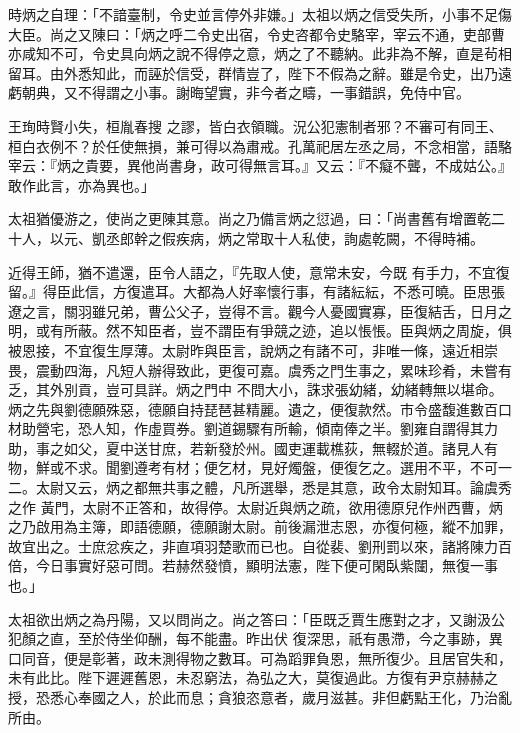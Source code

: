 \begin{pinyinscope}
 時炳之自理：「不諳臺制，令史並言停外非嫌。」太祖以炳之信受失所，小事不足傷大臣。尚之又陳曰：「炳之呼二令史出宿，令史咨都令史駱宰，宰云不通，吏部曹亦咸知不可，令史具向炳之說不得停之意，炳之了不聽納。此非為不解，直是茍相留耳。由外悉知此，而誣於信受，群情豈了，陛下不假為之辭。雖是令史，出乃遠虧朝典，又不得謂之小事。謝晦望實，非今者之疇，一事錯誤，免侍中官。



 王珣時賢小失，桓胤春搜
 之謬，皆白衣領職。況公犯憲制者邪？不審可有同王、桓白衣例不？於任使無損，兼可得以為肅戒。孔萬祀居左丞之局，不念相當，語駱宰云：『炳之貴要，異他尚書身，政可得無言耳。』又云：『不癡不聾，不成姑公。』敢作此言，亦為異也。」



 太祖猶優游之，使尚之更陳其意。尚之乃備言炳之愆過，曰：「尚書舊有增置乾二十人，以元、凱丞郎幹之假疾病，炳之常取十人私使，詢處乾闕，不得時補。



 近得王師，猶不遣還，臣令人語之，『先取人使，意常未安，今既
 有手力，不宜復留。』得臣此信，方復遣耳。大都為人好率懷行事，有諸紜紜，不悉可曉。臣思張遼之言，關羽雖兄弟，曹公父子，豈得不言。觀今人憂國實寡，臣復結舌，日月之明，或有所蔽。然不知臣者，豈不謂臣有爭競之迹，追以悵悵。臣與炳之周旋，俱被恩接，不宜復生厚薄。太尉昨與臣言，說炳之有諸不可，非唯一條，遠近相崇畏，震動四海，凡短人辦得致此，更復可嘉。虞秀之門生事之，累味珍肴，未嘗有乏，其外別貢，豈可具詳。炳之門中
 不問大小，誅求張幼緒，幼緒轉無以堪命。炳之先與劉德願殊惡，德願自持琵琶甚精麗。遺之，便復款然。市令盛馥進數百口材助營宅，恐人知，作虛買券。劉道錫驟有所輸，傾南俸之半。劉雍自謂得其力助，事之如父，夏中送甘庶，若新發於州。國吏運載樵荻，無輟於道。諸見人有物，鮮或不求。聞劉遵考有材；便乞材，見好燭盤，便復乞之。選用不平，不可一二。太尉又云，炳之都無共事之體，凡所選舉，悉是其意，政令太尉知耳。論虞秀之作
 黃門，太尉不正答和，故得停。太尉近與炳之疏，欲用德原兒作州西曹，炳之乃啟用為主簿，即語德願，德願謝太尉。前後漏泄志恩，亦復何極，縱不加罪，故宜出之。士庶忿疾之，非直項羽楚歌而已也。自從裴、劉刑罰以來，諸將陳力百倍，今日事實好惡可問。若赫然發憤，顯明法憲，陛下便可閑臥紫闥，無復一事也。」



 太祖欲出炳之為丹陽，又以問尚之。尚之答曰：「臣既乏賈生應對之才，又謝汲公犯顏之直，至於侍坐仰酬，每不能盡。昨出伏
 復深思，祇有愚滯，今之事跡，異口同音，便是彰著，政未測得物之數耳。可為蹈罪負恩，無所復少。且居官失和，未有此比。陛下遲遲舊恩，未忍窮法，為弘之大，莫復過此。方復有尹京赫赫之授，恐悉心奉國之人，於此而息；貪狼恣意者，歲月滋甚。非但虧點王化，乃治亂所由。




\end{pinyinscope}
